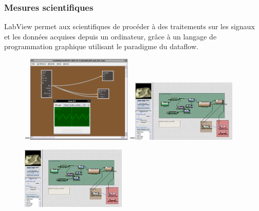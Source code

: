 \documentclass{article}
\begin{document}

\subsubsection{Mesures scientifiques}

LabView permet aux scientifiques de procéder à des traitements sur les signaux et les données acquises depuis un ordinateur, grâce à un
langage de programmation graphique utilisant le paradigme du dataflow.

\begin{figure}[ht] 
  =\hbox{\includegraphics[width=5cm]{alsa-modular-synth}}%
  =\hbox{\includegraphics[width=5cm]{world-machine}}%
  {\,}
  \hfill 
  \begin{minipage}{5cm}
    \centering
  \end{minipage}
  \hfill
  \begin{minipage}{5cm}
    \centering
    \includegraphics[width=5cm]{world-machine}
  \end{minipage}
  \hfill
  {\,}
  

\end{figure}
\end{document}
